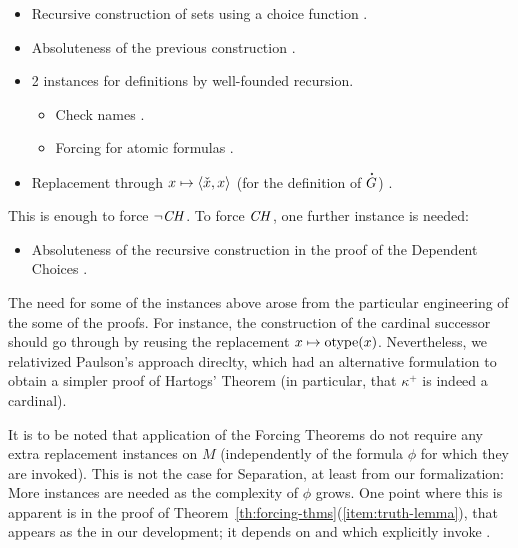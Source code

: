 \begin{itemize}
\item Recursive construction of sets using a choice function
  .
\item Absoluteness of the previous construction .
\item 2 instances for definitions by well-founded recursion.
  \begin{itemize}
  \item
    Check names
    .
  \item Forcing for atomic formulas
    .
  \end{itemize}
\item Replacement through $x\mapsto \langle\check{x},x\rangle$ (for the
  definition of $\punto{G}$)
  .
\end{itemize}
%
This is enough to force $\neg\mathit{CH}$. To force $\mathit{CH}$, one further instance is needed:
%
\begin{itemize}
\item Absoluteness of the recursive construction in the proof of the
  Dependent Choices .
\end{itemize}

The need for some of the instances above arose from the particular
engineering of the some of the proofs. For instance, the construction
of the cardinal successor should go through by reusing the replacement
$x\mapsto \operatorname{otype}(x)$. Nevertheless, we relativized Paulson's
approach direclty, which had an alternative formulation to obtain a
simpler proof of Hartogs' Theorem (in particular, that $\kappa^+$ is
indeed a cardinal).

It is to be noted that application of the Forcing Theorems do not
require any extra replacement instances on $M$ (independently of the
formula $\phi$ for which they are invoked). This is not the case for
Separation, at least from our formalization: More instances are needed
as the complexity of $\phi$ grows. One point where this is apparent is
in the proof of Theorem~\ref{th:forcing-thms}(\ref{item:truth-lemma}),
that appears as the  in our development; it
depends on  and
 which explicitly invoke
.

